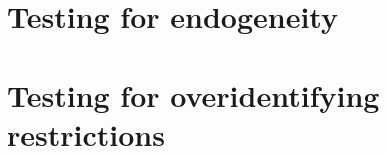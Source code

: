 \section{Testing for endogeneity}
\label{app:endogeneity}



\section{Testing for overidentifying restrictions}
\label{app:overidentifying}

